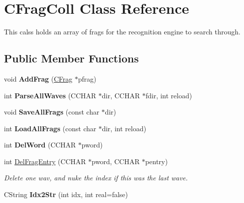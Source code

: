 \hypertarget{class_c_frag_coll}{\section{C\-Frag\-Coll Class Reference}
\label{class_c_frag_coll}
}


This calss holds an array of frags for the recognition engine to search through.  


\subsection*{Public Member Functions}
\begin{DoxyCompactItemize}
\item 
\hypertarget{class_c_frag_coll_afe96e72892c9edcdd3f7c9cd76b78e60}{void {\bfseries Add\-Frag} (\hyperlink{class_c_frag}{C\-Frag} $\ast$pfrag)}\label{class_c_frag_coll_afe96e72892c9edcdd3f7c9cd76b78e60}

\item 
\hypertarget{class_c_frag_coll_aa1e4760e687081ab581011bc3c3b1523}{int {\bfseries Parse\-All\-Waves} (C\-C\-H\-A\-R $\ast$dir, C\-C\-H\-A\-R $\ast$fdir, int reload)}\label{class_c_frag_coll_aa1e4760e687081ab581011bc3c3b1523}

\item 
\hypertarget{class_c_frag_coll_a262116ab5122e7e4b39c9606926abd73}{void {\bfseries Save\-All\-Frags} (const char $\ast$dir)}\label{class_c_frag_coll_a262116ab5122e7e4b39c9606926abd73}

\item 
\hypertarget{class_c_frag_coll_a21d012fac0ff6929521c13eb5776a9db}{int {\bfseries Load\-All\-Frags} (const char $\ast$dir, int reload)}\label{class_c_frag_coll_a21d012fac0ff6929521c13eb5776a9db}

\item 
\hypertarget{class_c_frag_coll_aa0fea9522694d1a3bd4509ed41dcefa2}{int {\bfseries Del\-Word} (C\-C\-H\-A\-R $\ast$pword)}\label{class_c_frag_coll_aa0fea9522694d1a3bd4509ed41dcefa2}

\item 
int \hyperlink{class_c_frag_coll_a076f6f4da36f3d5e18c69c0e51577343}{Del\-Frag\-Entry} (C\-C\-H\-A\-R $\ast$pword, C\-C\-H\-A\-R $\ast$pentry)
\begin{DoxyCompactList}\small\item\em Delete one wav, and nuke the index if this was the last wave. \end{DoxyCompactList}\item 
\hypertarget{class_c_frag_coll_a33f648bd97c5db0ed7977d73e32ad082}{C\-String {\bfseries Idx2\-Str} (int idx, int real=false)}\label{class_c_frag_coll_a33f648bd97c5db0ed7977d73e32ad082}


\end{DoxyCompactItemize}

